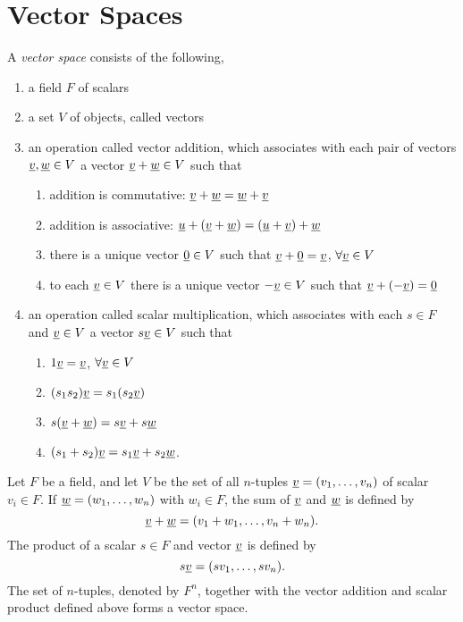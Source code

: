 \section{Vector Spaces}

\begin{definition} \label{definition:VectorSpace}
A \emph{vector space} consists of the following,
\begin{enumerate}
\item a field $F$ of scalars
\item a set $V$ of objects, called vectors
\item an operation called vector addition, which associates with each pair of vectors $\underline{v}, \underline{w} \in V$ a vector $\underline{v} + \underline{w} \in V$ such that
\begin{enumerate}
\item addition is commutative: $\underline{v} + \underline{w} = \underline{w} + \underline{v}$
\item addition is associative: $\underline{u} + (\underline{v} + \underline{w}) = (\underline{u} + \underline{v}) + \underline{w}$
\item there is a unique vector $\underline{0} \in V$ such that $\underline{v} + \underline{0} = \underline{v}$, $\forall \underline{v} \in V$
\item to each $\underline{v} \in V$ there is a unique vector $- \underline{v} \in V$ such that $\underline{v} + (- \underline{v}) = \underline{0}$
\end{enumerate}
\item an operation called scalar multiplication, which associates with each $s \in F$ and $\underline{v} \in V$ a vector $s \underline{v} \in V$ such that
\begin{enumerate}
\item $1 \underline{v} = \underline{v}$, $\forall \underline{v} \in V$
\item $(s_1 s_2) \underline{v} = s_1 ( s_2 \underline{v} )$
\item $s ( \underline{v} + \underline{w} ) = s \underline{v} + s \underline{w}$
\item $(s_1 + s_2) \underline{v} = s_1 \underline{v} + s_2 \underline{w}$.
\end{enumerate}
\end{enumerate}
\end{definition}

\begin{example}
Let $F$ be a field, and let $V$ be the set of all $n$-tuples $\underline{v} = (v_1, \ldots, v_n)$ of scalar $v_i \in F$.
If $\underline{w} = (w_1, \ldots, w_n)$ with $w_i \in F$, the sum of $\underline{v}$ and $\underline{w}$ is defined by
\begin{equation*}
\underline{v} + \underline{w} = (v_1 + w_1, \ldots, v_n + w_n).
\end{equation*}
The product of a scalar $s \in F$ and vector $\underline{v}$ is defined by
\begin{equation*}
s \underline{v} = (s v_1, \ldots, s v_n).
\end{equation*}
The set of $n$-tuples, denoted by $F^n$, together with the vector addition and scalar product defined above forms a vector space.
\end{example}

